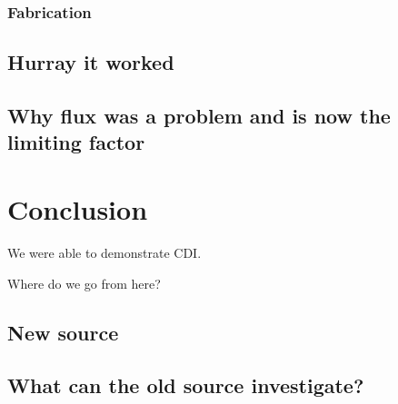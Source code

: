 \subsection{Fabrication}

\section{Hurray it worked}

\section{Why flux was a problem and is now the limiting factor}



\chapter{Conclusion}

We were able to demonstrate CDI.

Where do we go from here?

\section{New source}

\section{What can the old source investigate?}


